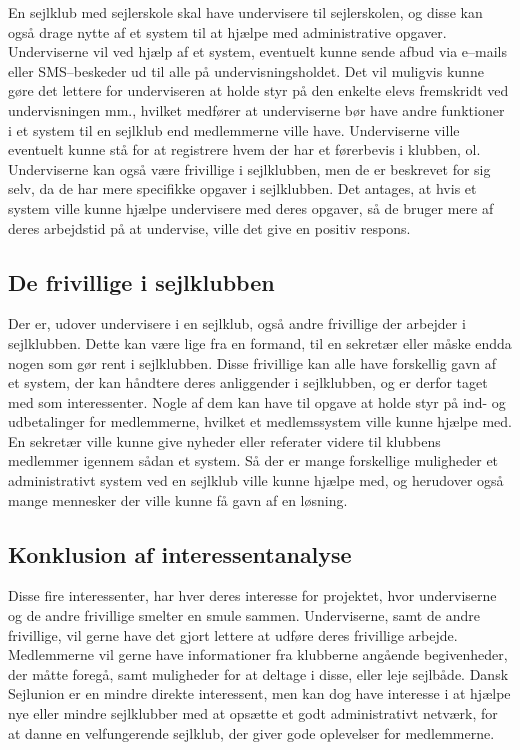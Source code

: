 En sejlklub med sejlerskole skal have undervisere til sejlerskolen, og disse kan også drage nytte af et system
til at hjælpe med administrative opgaver. Underviserne vil ved hjælp af et system, eventuelt kunne sende
afbud via e--mails eller SMS--beskeder ud til alle på undervisningsholdet. Det vil muligvis kunne gøre det lettere
for underviseren at holde styr på den enkelte elevs fremskridt ved undervisningen mm., hvilket medfører at
underviserne bør have andre funktioner i et system til en sejlklub end medlemmerne ville have. Underviserne
ville eventuelt kunne stå for at registrere hvem der har et førerbevis i klubben, ol. Underviserne kan også
være frivillige i sejlklubben, men de er beskrevet for sig selv, da de har mere specifikke opgaver i
sejlklubben. Det antages, at hvis et system ville kunne hjælpe undervisere med deres opgaver, så de bruger
mere af deres arbejdstid på at undervise, ville det give en positiv respons.


\subsection{De frivillige i sejlklubben}

Der er, udover undervisere i en sejlklub, også andre frivillige der arbejder i sejlklubben. Dette kan være
lige fra en formand, til en sekretær eller måske endda nogen som gør rent i sejlklubben. Disse frivillige kan
alle have forskellig gavn af et system, der kan håndtere deres anliggender i sejlklubben, og er derfor taget
med som interessenter. Nogle af dem kan have til opgave at holde styr på ind- og udbetalinger for medlemmerne,
hvilket et medlemssystem ville kunne hjælpe med. En sekretær ville kunne give nyheder eller referater videre
til klubbens medlemmer igennem sådan et system. Så der er mange forskellige muligheder et administrativt
system ved en sejlklub ville kunne hjælpe med, og herudover også mange mennesker der ville kunne få gavn af en
løsning.


\subsection{Konklusion af interessentanalyse}

Disse fire interessenter, har hver deres interesse for projektet, hvor underviserne og de andre frivillige
smelter en smule sammen. Underviserne, samt de andre frivillige, vil gerne have det gjort lettere at udføre
deres frivillige arbejde. Medlemmerne vil gerne have informationer fra klubberne angående begivenheder, der
måtte foregå, samt muligheder for at deltage i disse, eller leje sejlbåde. Dansk Sejlunion er en mindre
direkte interessent, men kan dog have interesse i at hjælpe nye eller mindre sejlklubber med at opsætte et
godt administrativt netværk, for at danne en velfungerende sejlklub, der giver gode oplevelser for
medlemmerne.

